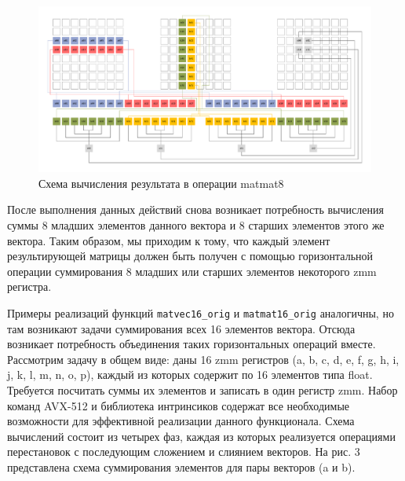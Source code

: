 \begin{figure}[ht]
	\centering
		\includegraphics[width=1.00\textwidth]{./pics/text_4_small_matr/matmat8.pdf}
	\caption{Схема вычисления результата в операции matmat8}
	\label{fig:text_4_small_matr_matmat8}
\end{figure}

После выполнения данных действий снова возникает потребность вычисления суммы 8 младших элементов данного вектора и 8 старших элементов этого же вектора.
Таким образом, мы приходим к тому, что каждый элемент результирующей матрицы должен быть получен с помощью горизонтальной операции суммирования 8 младших или старших элементов некоторого zmm регистра.

Примеры реализаций функций \texttt{matvec16\_orig} и \texttt{matmat16\_orig} аналогичны, но там возникают задачи суммирования всех 16 элементов вектора.
Отсюда возникает потребность объединения таких горизонтальных операций вместе.
Рассмотрим задачу в общем виде: даны 16 zmm регистров (a, b, c, d, e, f, g, h, i, j, k, l, m, n, o, p), каждый из которых содержит по 16 элементов типа float.
Требуется посчитать суммы их элементов и записать в один регистр zmm.
Набор команд AVX-512 и библиотека интринсиков содержат все необходимые возможности для эффективной реализации данного функционала.
Схема вычислений состоит из четырех фаз, каждая из которых реализуется операциями перестановок с последующим сложением и слиянием векторов.
На рис. 3 представлена схема суммирования элементов для пары векторов (a и b).


